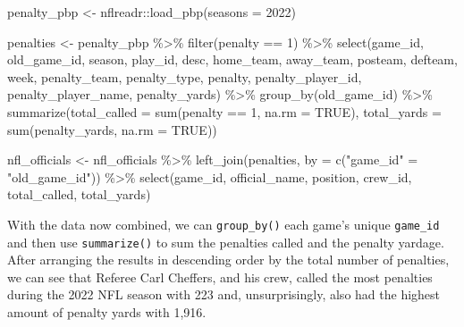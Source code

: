 \documentclass[
  letterpaper,
]{krantz}
\newenvironment{Shaded}{\begin{snugshade}}{\end{snugshade}}
\newcommand{\AttributeTok}[1]{\textcolor[rgb]{0.40,0.45,0.13}{#1}}
\newcommand{\ConstantTok}[1]{\textcolor[rgb]{0.56,0.35,0.01}{#1}}
\newcommand{\DecValTok}[1]{\textcolor[rgb]{0.68,0.00,0.00}{#1}}
\newcommand{\FunctionTok}[1]{\textcolor[rgb]{0.28,0.35,0.67}{#1}}
\newcommand{\NormalTok}[1]{\textcolor[rgb]{0.00,0.23,0.31}{#1}}
\newcommand{\OtherTok}[1]{\textcolor[rgb]{0.00,0.23,0.31}{#1}}
\newcommand{\SpecialCharTok}[1]{\textcolor[rgb]{0.37,0.37,0.37}{#1}}
\newcommand{\StringTok}[1]{\textcolor[rgb]{0.13,0.47,0.30}{#1}}
\begin{document}
\begin{Shaded}
\begin{Highlighting}[]
\NormalTok{penalty\_pbp }\OtherTok{\textless{}{-}}\NormalTok{ nflreadr}\SpecialCharTok{::}\FunctionTok{load\_pbp}\NormalTok{(}\AttributeTok{seasons =} \DecValTok{2022}\NormalTok{)}

\NormalTok{penalties }\OtherTok{\textless{}{-}}\NormalTok{ penalty\_pbp }\SpecialCharTok{\%\textgreater{}\%}
  \FunctionTok{filter}\NormalTok{(penalty }\SpecialCharTok{==} \DecValTok{1}\NormalTok{) }\SpecialCharTok{\%\textgreater{}\%}
  \FunctionTok{select}\NormalTok{(game\_id, old\_game\_id, season, play\_id,}
\NormalTok{         desc, home\_team, away\_team,}
\NormalTok{         posteam, defteam, week, penalty\_team,}
\NormalTok{         penalty\_type, penalty, penalty\_player\_id,}
\NormalTok{         penalty\_player\_name, penalty\_yards) }\SpecialCharTok{\%\textgreater{}\%}
  \FunctionTok{group\_by}\NormalTok{(old\_game\_id) }\SpecialCharTok{\%\textgreater{}\%}
  \FunctionTok{summarize}\NormalTok{(}\AttributeTok{total\_called =} \FunctionTok{sum}\NormalTok{(penalty }\SpecialCharTok{==} \DecValTok{1}\NormalTok{, }\AttributeTok{na.rm =} \ConstantTok{TRUE}\NormalTok{),}
            \AttributeTok{total\_yards =} \FunctionTok{sum}\NormalTok{(penalty\_yards, }\AttributeTok{na.rm =} \ConstantTok{TRUE}\NormalTok{))}

\NormalTok{nfl\_officials }\OtherTok{\textless{}{-}}\NormalTok{ nfl\_officials }\SpecialCharTok{\%\textgreater{}\%}
  \FunctionTok{left\_join}\NormalTok{(penalties, }\AttributeTok{by =} \FunctionTok{c}\NormalTok{(}\StringTok{"game\_id"} \OtherTok{=} \StringTok{"old\_game\_id"}\NormalTok{)) }\SpecialCharTok{\%\textgreater{}\%}
  \FunctionTok{select}\NormalTok{(game\_id, official\_name, position,}
\NormalTok{         crew\_id, total\_called, total\_yards)}
\end{Highlighting}
\end{Shaded}

With the data now combined, we can \texttt{group\_by()} each game's
unique \texttt{game\_id} and then use \texttt{summarize()} to sum the
penalties called and the penalty yardage. After arranging the results in
descending order by the total number of penalties, we can see that
Referee Carl Cheffers, and his crew, called the most penalties during
the 2022 NFL season with 223 and, unsurprisingly, also had the highest
amount of penalty yards with 1,916.
\end{document}
